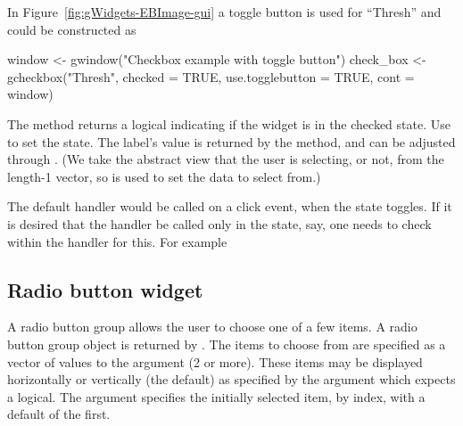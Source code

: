In Figure~\ref{fig:gWidgets-EBImage-gui} a toggle button is used for
``Thresh''  and could be constructed as

\begin{Schunk}
\begin{Sinput}
 window <- gwindow("Checkbox example with toggle button")
 check_box <- gcheckbox("Thresh", checked = TRUE, 
                        use.togglebutton = TRUE, cont = window)
\end{Sinput}
\end{Schunk}

The  method returns a logical indicating if
the widget is in the checked state. Use  to set
the state. The label's value is returned by the
\method{[}{gcheckbox} method, and can be adjusted through 
\method{[\ASSIGN}{gcheckbox}. (We take the abstract view that the user
is selecting, or not, from the length-1 vector, so \meth{[} is used to
set the data to select from.)

The default handler would be called on a click event, when the state toggles. If it is desired
that the handler be called only in the  state, say, one
needs to check within the handler for this. For example
\begin{Schunk}
\end{Schunk}

\subsection{Radio button widget}
\label{sec:gWidgets-radio-button-widget}

A radio button group allows the user to choose one of a few
items. A radio button group object is returned by
. The items to choose from are specified as a
vector of values to the  argument (2 or more). These items
may be displayed horizontally or vertically (the default) as specified by the
 argument which expects a logical. The
 argument specifies the initially selected
item, by index,
with a default of the first.


